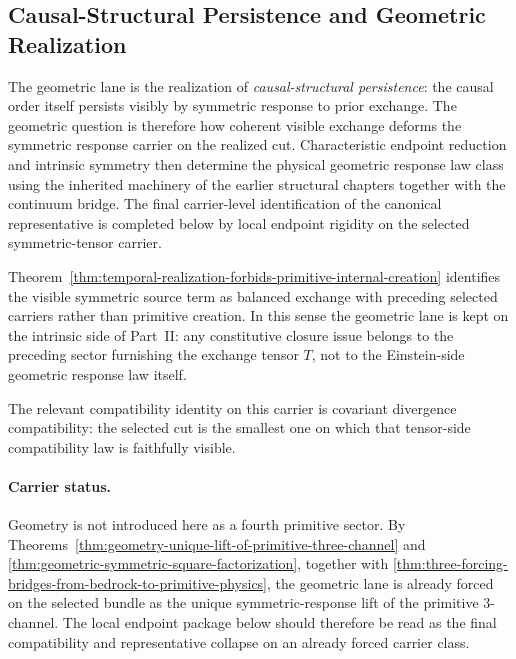 \subsection{Causal-Structural Persistence and Geometric Realization}
\label{sec:flagship-geometry}

The geometric lane is the realization of \emph{causal-structural persistence}:
the causal order itself persists visibly by symmetric response to prior
exchange. The geometric question is therefore how coherent visible exchange
deforms the symmetric response carrier on the realized cut. Characteristic
endpoint reduction and intrinsic symmetry then determine the physical
geometric response law class using the inherited machinery of the earlier
structural chapters together with the continuum bridge. The
final carrier-level identification of the canonical representative is
completed below by local endpoint rigidity on the selected symmetric-tensor
carrier.

Theorem~\ref{thm:temporal-realization-forbids-primitive-internal-creation}
identifies the visible symmetric source term as balanced exchange with
preceding selected carriers rather than primitive creation. In this sense the
geometric lane is kept on the intrinsic side of Part~II: any constitutive
closure issue belongs to the preceding sector furnishing the exchange tensor
\(T\), not to the Einstein-side geometric response law itself.

The relevant compatibility identity on this carrier is covariant divergence
compatibility: the selected cut is the smallest one on which that tensor-side
compatibility law is faithfully visible.

\paragraph{Carrier status.}
Geometry is not introduced here as a fourth primitive sector. By
Theorems~\ref{thm:geometry-unique-lift-of-primitive-three-channel} and
\ref{thm:geometric-symmetric-square-factorization}, together with
\ref{thm:three-forcing-bridges-from-bedrock-to-primitive-physics}, the
geometric lane is already forced on the selected bundle as the unique
symmetric-response lift of the primitive \(3\)-channel. The local endpoint
package below should therefore be read as the final compatibility and
representative collapse on an already forced carrier class.

